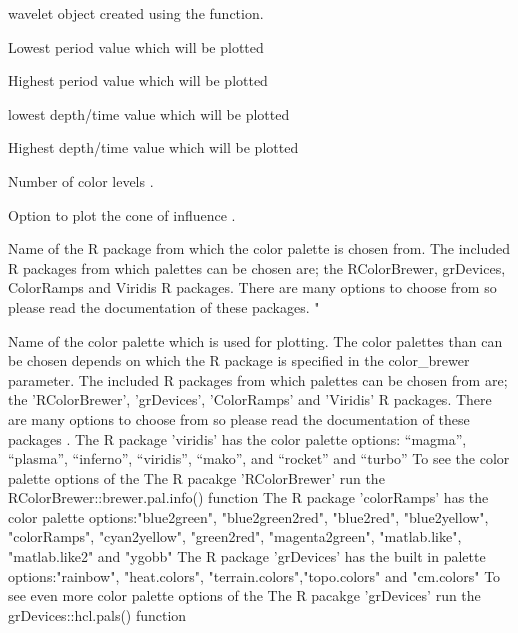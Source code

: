 \documentclass[a4paper]{book}
\begin{document}
\begin{Arguments}
\begin{ldescription}
\item[\code{wavelet}] wavelet object created using the  function.

\item[\code{lowerPeriod}] Lowest period value which will be plotted

\item[\code{upperPeriod}] Highest period value which will be plotted

\item[\code{lower\_depth\_time}] lowest depth/time value which will be plotted

\item[\code{upper\_depth\_time}] Highest depth/time value which will be plotted

\item[\code{n.levels}] Number of color levels .

\item[\code{plot.COI}] Option to plot the cone of influence .

\item[\code{color\_brewer}] Name of the R package from which the color palette is chosen from.
The included R packages from which palettes can be chosen
are; the RColorBrewer, grDevices, ColorRamps and Viridis R packages.
There are many options to choose from so please
read the documentation of these packages. "

\item[\code{palette\_name}] Name of the color palette which is used for plotting.
The color palettes than can be chosen depends on which the R package is specified in
the color\_brewer parameter. The included R packages from which palettes can be chosen
from are; the 'RColorBrewer', 'grDevices', 'ColorRamps' and 'Viridis' R packages.
There are many options to choose from so please
read the documentation of these packages .
The R package 'viridis' has the color palette options: “magma”, “plasma”,
“inferno”, “viridis”, “mako”, and “rocket”  and “turbo”
To see the color palette options of the The R pacakge 'RColorBrewer' run
the RColorBrewer::brewer.pal.info() function
The R package 'colorRamps' has the color palette options:"blue2green",
"blue2green2red", "blue2red",    "blue2yellow", "colorRamps",    "cyan2yellow",
"green2red", "magenta2green", "matlab.like", "matlab.like2" and    "ygobb"
The R package 'grDevices' has the built in  palette options:"rainbow",
"heat.colors", "terrain.colors","topo.colors" and "cm.colors"
To see even more color palette options of the The R pacakge 'grDevices' run
the grDevices::hcl.pals() function


\end{ldescription}
\end{Arguments}
\end{document}
